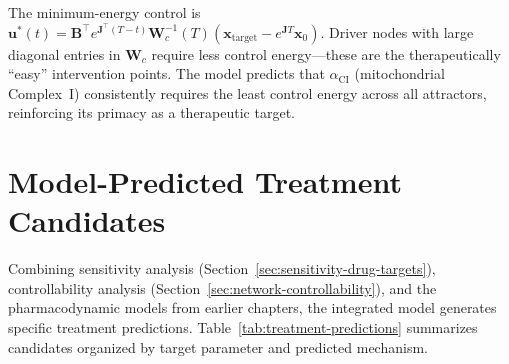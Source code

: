 The minimum-energy control is $\mathbf{u}^*(t) = \mathbf{B}^\top e^{\mathbf{J}^\top(T-t)} \mathbf{W}_c^{-1}(T) (\mathbf{x}_{\text{target}} - e^{\mathbf{J}T}\mathbf{x}_0)$. Driver nodes with large diagonal entries in $\mathbf{W}_c$ require less control energy---these are the therapeutically ``easy'' intervention points. The model predicts that $\alpha_{\text{CI}}$ (mitochondrial Complex~I) consistently requires the least control energy across all attractors, reinforcing its primacy as a therapeutic target.

\section{Model-Predicted Treatment Candidates}
\label{sec:treatment-candidates}

Combining sensitivity analysis (Section~\ref{sec:sensitivity-drug-targets}), controllability analysis (Section~\ref{sec:network-controllability}), and the pharmacodynamic models from earlier chapters, the integrated model generates specific treatment predictions. Table~\ref{tab:treatment-predictions} summarizes candidates organized by target parameter and predicted mechanism.

